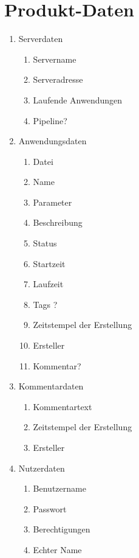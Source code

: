 \section{Produkt-Daten}


\newenvironment{enumPH}[1]{
	\begin{enumerate}[label=/#1\arabic*0/, leftmargin=1.6cm, noitemsep]}
	{\end{enumerate}
}




\begin{enumPH}{D}
	\item \label{server_daten}Serverdaten
	\begin{enumPH}{D}
		\item Servername
		\item Serveradresse
		\item Laufende Anwendungen
		\item Pipeline?
	\end{enumPH}

    \item \label{anwendungs_daten}Anwendungsdaten
    \begin{enumPH}{D}
    	\item Datei
        \item Name
        \item Parameter
        \item Beschreibung
        \item Status
        \item Startzeit
        \item Laufzeit
        \item Tags ?
        \item Zeitstempel der Erstellung
        \item \label{experiment_ersteller}Ersteller
        \item Kommentar?
    \end{enumPH}

    \item \label{kommentar_daten}Kommentardaten
    \begin{enumPH}{D}
        \item Kommentartext
        \item Zeitstempel der Erstellung
        \item \label{kommentar_ersteller}Ersteller
    \end{enumPH}

    \item \label{nutzer_daten}Nutzerdaten
    \begin{enumPH}{D}
        \item Benutzername
        \item Passwort
        \item Berechtigungen
        \item Echter Name
    \end{enumPH}
\end{enumPH}
\newpage
